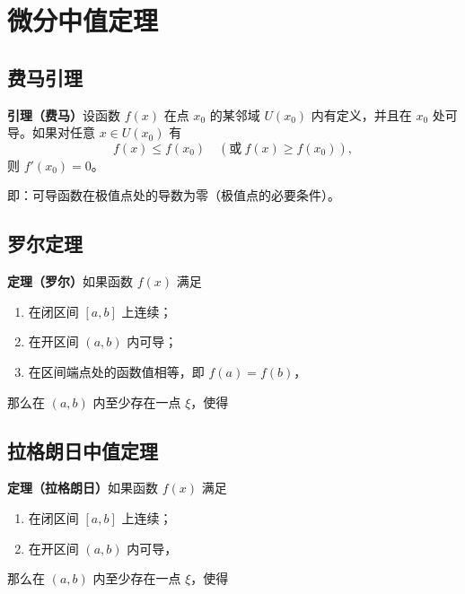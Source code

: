 
\section{微分中值定理}

\subsection{费马引理}
\textbf{引理（费马）}\quad 设函数 $f(x)$ 在点 $x_0$ 的某邻域 $U(x_0)$ 内有定义，并且在 $x_0$ 处可导。如果对任意 $x\in U(x_0)$ 有
\[
f(x)\le f(x_0)\quad(\text{或}\ f(x)\ge f(x_0)),
\]
则 $f'(x_0)=0$。

\noindent 即：可导函数在极值点处的导数为零（极值点的必要条件）。


\subsection{罗尔定理}
\textbf{定理（罗尔）}\quad 如果函数 $f(x)$ 满足
\begin{enumerate}
    \item 在闭区间 $[a,b]$ 上连续；
    \item 在开区间 $(a,b)$ 内可导；
    \item 在区间端点处的函数值相等，即 $f(a)=f(b)$，
\end{enumerate}
那么在 $(a,b)$ 内至少存在一点 $\xi$，使得

\subsection{拉格朗日中值定理}
\textbf{定理（拉格朗日）}\quad 如果函数 $f(x)$ 满足
\begin{enumerate}
    \item 在闭区间 $[a,b]$ 上连续；
    \item 在开区间 $(a,b)$ 内可导，
\end{enumerate}
那么在 $(a,b)$ 内至少存在一点 $\xi$，使得

